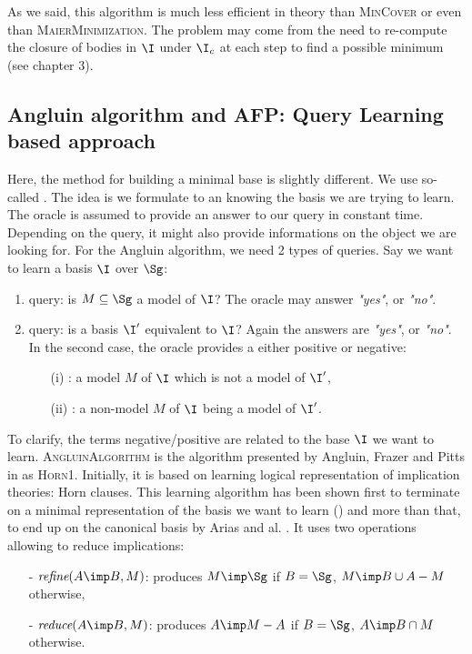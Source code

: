 \begin{figure}[ht]
	
\end{figure}

As we said, this algorithm is much less 
efficient in theory than \textsc{MinCover} or even than \textsc{MaierMinimization}. The problem may come from the need to re-compute the closure of bodies in $\I$ under $\I_c$ at each step to find a possible minimum (see chapter 3).

\subsection{Angluin algorithm and AFP: Query Learning based approach}

Here, the method for building a minimal base is slightly different. We use 
so-called . The idea is we formulate 
to an  knowing the basis we are trying to learn. The oracle 
is assumed to provide an answer to our query in constant time. Depending on 
the query, it might also provide informations on the object we are looking for.
For the Angluin algorithm, we need 2 types of queries. Say we want to learn
a basis $\I$ over $\Sg$:
\begin{enumerate}
	\item {} query: is $M \subseteq \Sg$ a model of $\I$? The
	oracle may answer \textit{"yes"}, or \textit{"no"}.
	\item {} query: is a basis $\I'$ equivalent to $\I$? Again
	the answers are \textit{"yes"}, or \textit{"no"}. In the second case, the oracle provides a	 either positive or negative:
	\begin{itemize}
		\item[(i)] : a model $M$ of $\I$ which is not a
		model of $\I'$,
		\item[(ii)] : a non-model $M$ of $\I$ being a model
		of $\I'$. 
	\end{itemize}
\end{enumerate}
\noindent To clarify, the terms negative/positive are related to the base $\I$
we want to learn. \textsc{AngluinAlgorithm} is the algorithm presented by Angluin, Frazer and Pitts in \cite{angluin_learning_1992} as \textsc{Horn1}. 
Initially, it is based on learning logical representation of implication theories: Horn clauses. This learning algorithm has been shown first to terminate on a minimal representation of the basis we want to learn (\cite{angluin_learning_1992}) and more than that, to end up on the canonical
basis by Arias and al. \cite{arias_canonical_2009}. It uses two operations allowing to reduce implications:
\begin{itemize}
	\item[-] $\textit{refine}(A \imp B, M)$: produces $M \imp \Sg$ if $B = \Sg$, $M \imp B \cup A - M$ otherwise,
	\item[-] $\textit{reduce}(A \imp B, M)$: produces $A \imp M - A$ if $B = \Sg$, $A \imp B \cap M$ otherwise.
\end{itemize}

